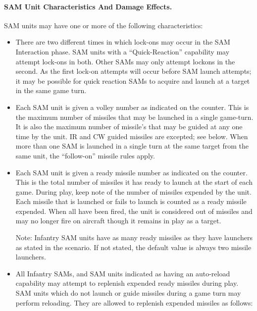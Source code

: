 \paragraph{SAM Unit Characteristics And Damage Effects.} SAM units may have one or more of the following characteristics:

\begin{itemize}
    \item{} There are two different times in which lock-ons may occur in the SAM Interaction phase. SAM units with a “Quick-Reaction” capability may attempt lock-ons in both. Other SAMs may only attempt lock­ons in the second. As the first lock-on attempts will occur before SAM launch attempts; it may be possible for quick reaction SAMs to acquire and launch at a target in the same game turn.


    \item{} Each SAM unit is given a volley number as indicated on the counter. This is the maximum number of missiles that may be launched in a single game-turn. It is also the maximum number of missile's that may be guided at any one time by the unit. IR and CW guided missiles are excepted; see below. When more than one SAM is launched in a single turn at the same target from the same unit, the “follow-on” missile rules apply.

    \item{} Each SAM unit is given a ready missile number as indicated on the counter. This is the total number of missiles it has ready to launch at the start of each game. During play, keep note of the number of missiles expended by the unit. Each missile that is launched or fails to launch is counted as a ready missile expended. When all have been fired, the unit is considered out of missiles and may no longer fire on aircraft though it remains in play as a target.

    Note: Infantry SAM units have as many ready missiles as they have launchers as stated in the scenario. If not stated, the default value is always two missile launchers.

    \item{} All Infantry SAMs, and SAM units indicated as having an auto-reload capability may attempt to replenish expended ready missiles during play. SAM units which do not launch or guide missiles during a game turn may perform reloading. They are allowed to replenish expended missiles as follows:
    

\end{itemize}

